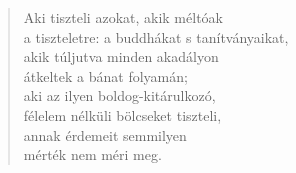 \begin{verse}
 Aki tiszteli azokat, akik méltóak\\
a tiszteletre: a buddhákat s tanítványaikat,\\
akik túljutva minden akadályon\\
átkeltek a bánat folyamán;\\
aki az ilyen boldog-kitárulkozó,\\
félelem nélküli bölcseket tiszteli,\\
annak érdemeit semmilyen\\
mérték nem méri meg.

\end{verse}
